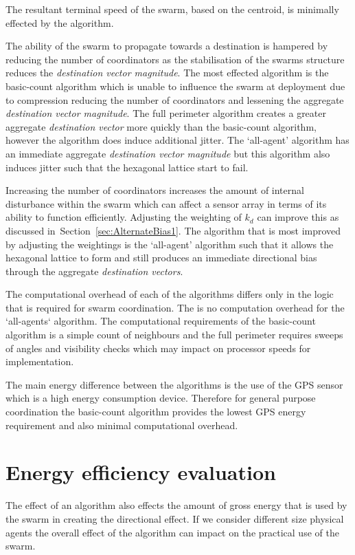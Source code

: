 \documentclass{ieeeaccess}
\begin{document}
The resultant terminal speed of the swarm, based on the centroid, is minimally effected by the algorithm. 

The ability of the swarm to propagate towards a destination is hampered by reducing the number of coordinators as the stabilisation of the swarms structure reduces the \textit{destination vector magnitude}. The most effected algorithm is the basic-count algorithm which is unable to influence the swarm at deployment due to compression reducing the number of coordinators and lessening the aggregate \textit{destination vector magnitude}. The full perimeter algorithm creates a greater aggregate \textit{destination vector} more quickly than the basic-count algorithm, however the algorithm does induce additional jitter. The `all-agent' algorithm has an immediate aggregate \textit{destination vector magnitude} but this algorithm also induces jitter such that the hexagonal lattice start to fail.
 
Increasing the number of coordinators increases the amount of internal disturbance within the swarm which can affect a sensor array in terms of its ability to function efficiently. Adjusting the weighting of $k_d$ can improve this as discussed in~Section~\ref{sec:AlternateBias1}. The algorithm that is most improved by adjusting the weightings is the `all-agent' algorithm such that it allows the hexagonal lattice to form and still produces an immediate directional bias through the aggregate \textit{destination vectors}.  

The computational overhead of each of the algorithms differs only in the logic that is required for swarm coordination. The is no computation overhead for the `all-agents` algorithm. The computational requirements of the basic-count algorithm is a simple count of neighbours and the full perimeter requires sweeps of angles and visibility checks which may impact on processor speeds for implementation. 

The main energy difference between the algorithms is the use of the GPS sensor which is a high energy consumption device. Therefore for general purpose coordination the basic-count algorithm provides the lowest GPS energy requirement and also minimal computational overhead.

\section{Energy efficiency evaluation}\label{reduced:EnergyReductionGPS}
The effect of an algorithm also effects the amount of gross energy that is used by the swarm in creating the directional effect. If we consider different size physical agents the overall effect of the algorithm can impact on the practical use of the swarm.
\end{document}
